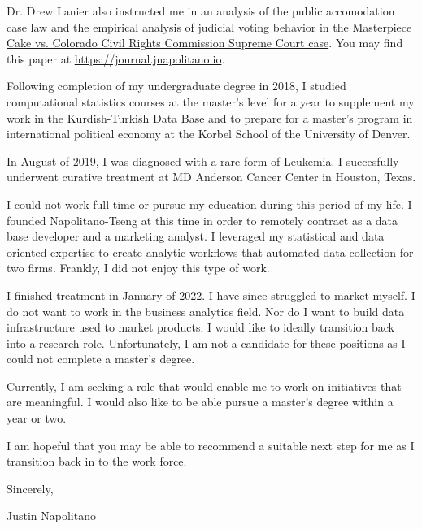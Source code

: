 \documentclass{ExpressiveCoverLetter}
\begin{document}
\begin{flushleft}
\begin{normalsize}
    Dr. Drew Lanier also instructed me in an analysis of the public accomodation case law and the empirical analysis of judicial voting behavior in the \href{https://www.law.cornell.edu/supremecourt/text/16-111}{Masterpiece Cake vs. Colorado Civil Rights Commission Supreme Court case}.  You may find this paper at \href{https://journal.jnapolitano.io/parts/articles/project-supcourt-masterpiececake/index.html}{https://journal.jnapolitano.io}.

    Following completion of my undergraduate degree in 2018, I studied computational statistics courses at the master's level for a year to supplement my work in the Kurdish-Turkish Data Base and to prepare for a master's program in international political economy at the Korbel School of the University of Denver.  

    In August of 2019, I was diagnosed with a rare form of Leukemia.  I succesfully underwent curative treatment at MD Anderson Cancer Center in Houston, Texas.

    I could not work full time or pursue my education during this period of my life.  I founded Napolitano-Tseng at this time in order to remotely contract as a data base developer and a marketing analyst.  I leveraged my statistical and data oriented expertise to create analytic workflows that automated data collection for two firms.  Frankly, I did not enjoy this type of work.  

    I finished treatment in January of 2022.  I have since struggled to market myself.  I do not want to work in the business analytics field. Nor do I want to build data infrastructure used to market products.  I would like to ideally transition back into a research role.  Unfortunately, I am not a candidate for these positions as I could not complete a master's degree.  

    Currently, I am seeking a role that would enable me to work on initiatives that are meaningful.  I would also like to be able pursue a master's degree within a year or two.  

    I am hopeful that you may be able to recommend a suitable next step for me as I transition back in to the work force.

    \vspace{.15in}

    Sincerely,

    \vspace{.15in}

    Justin Napolitano

\end{normalsize}
\end{flushleft}
\end{document}

